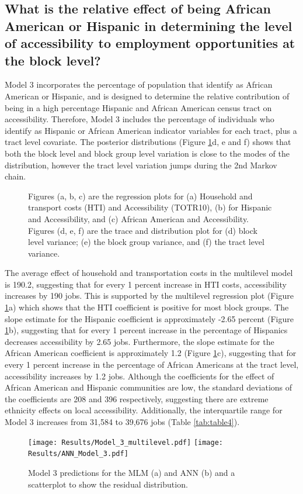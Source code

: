 \documentclass[a4paper,UKenglish]{lipics-v2018}
\begin{document}
\subsection{What is the relative effect of being African American or Hispanic in determining the level of accessibility to employment opportunities at the block level?}
Model 3 incorporates the percentage of population that identify as African American or Hispanic, and is designed to determine the relative contribution of being in a high percentage Hispanic and African American census tract on accessibility. Therefore, Model 3 includes the percentage of individuals who identify as Hispanic or African American indicator variables for each tract, plus a tract level covariate. The posterior distributions (Figure \ref{fig:Fit_3_robust}d, e and f) shows that both the block level and block group level variation is close to the modes of the distribution, however the tract level variation jumps during the 2nd Markov chain. 

\begin{figure}[H]
    \centering
    \caption[Model 3 Trace and Posterior plots]{Figures (a, b, c) are the regression plots for (a) Household and transport costs (HTI) and Accessibility (TOTR10), (b) for Hispanic and Accessibility, and (c) African American and Accessibility. Figures (d, e, f) are the trace and distribution plot for (d) block level variance; (e) the block group variance, and (f) the tract level variance.} 
    \label{fig:Fit_3_robust}
\end{figure}

The average effect of household and transportation costs in the multilevel model is 190.2, suggesting that for every 1 percent increase in HTI costs, accessibility increases by 190 jobs. This is supported by the multilevel regression plot (Figure \ref{fig:Fit_3_robust}a) which shows that the HTI coefficient is positive for most block groups. The slope estimate for the Hispanic coefficient is approximately -2.65 percent (Figure \ref{fig:Fit_3_robust}b), suggesting that for every 1 percent increase in the percentage of Hispanics decreases accessibility by 2.65 jobs. Furthermore, the slope estimate for the African American coefficient is approximately 1.2 (Figure \ref{fig:Fit_3_robust}c), suggesting that for every 1 percent increase in the percentage of African Americans at the tract level, accessibility increases by 1.2 jobs. Although the coefficients for the effect of African American and Hispanic communities are low, the standard deviations of the coefficients are 208 and 396 respectively, suggesting there are extreme ethnicity effects on local accessibility. Additionally, the interquartile range for Model 3 increases from 31,584 to 39,676 jobs (Table \ref{tab:table4}). 
\begin{figure}[H]
    \texttt{[image: Results/Model\_3\_multilevel.pdf]}
    \texttt{[image: Results/ANN\_Model\_3.pdf]}
    \caption[Model 3 predictions]{Model 3 predictions for the MLM (a) and ANN (b) and a scatterplot to show the residual distribution.} 
    \label{fig:Model_3_multilevel}
\end{figure}
\end{document}
